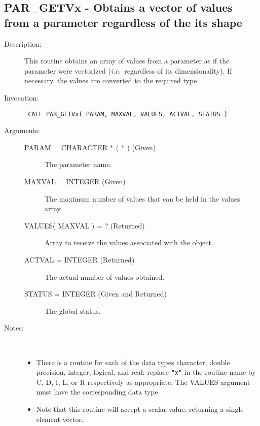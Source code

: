 \documentclass[twoside,11pt]{article}
\newcommand{\xlabel}[1]{}
\newlength{\sstbannerlength}
\newlength{\sstcaptionlength}
\newlength{\sstexampleslength}
\newlength{\sstexampleswidth}
\newcommand{\sstroutine}[3]{
   \goodbreak
   \rule{\textwidth}{0.5mm}
   \vspace{-7ex}
   \newline
   \settowidth{\sstbannerlength}{{\Large {\bf #1}}}
   \setlength{\sstcaptionlength}{\textwidth}
   \setlength{\sstexampleslength}{\textwidth}
   \addtolength{\sstbannerlength}{0.5em}
   \addtolength{\sstcaptionlength}{-2.0\sstbannerlength}
   \addtolength{\sstcaptionlength}{-5.0pt}
   \settowidth{\sstexampleswidth}{{\bf Examples:}}
   \addtolength{\sstexampleslength}{-\sstexampleswidth}
   \parbox[t]{\sstbannerlength}{\flushleft{\Large {\bf #1}}}
   \parbox[t]{\sstcaptionlength}{\center{\Large #2}}
   \parbox[t]{\sstbannerlength}{\flushright{\Large {\bf #1}}}
   \begin{description}
      #3
   \end{description}
}
\newcommand{\sstdescription}[1]{\item[Description:] #1}
\newcommand{\sstinvocation}[1]{\item[Invocation:]\hspace{0.4em}{\tt #1}}
\newcommand{\sstarguments}[1]{
   \item[Arguments:] \mbox{} \\
   \vspace{-3.5ex}
   \begin{description}
      #1
   \end{description}
}
\newcommand{\sstsubsection}[1]{ \item[{#1}] \mbox{} \\}
\newcommand{\sstnotes}[1]{\item[Notes:] \mbox{} \\[1.3ex] #1}
\newcommand{\sstitemlist}[1]{
  \mbox{} \\
  \vspace{-7ex}
  \begin{itemize}
     #1
  \end{itemize}
}
\newcommand{\sstitem}{\item}
\newcommand{\ssttt}{\tt}
\renewcommand{\sstroutine}[3]{
      \subsection{\xlabel{12}#1\xlabel{#1}-\label{#1}#2}
      \begin{description}
         #3
      \end{description}
   }
\renewcommand{\sstdescription}[1]{\item[Description:]
      \begin{description}
         #1
      \end{description}
   }
\renewcommand{\sstinvocation}[1]{\item[Invocation:]
      \begin{description}
         {\ssttt #1}
      \end{description}
   }
\renewcommand{\sstarguments}[1]{
      \item[Arguments:]
      \begin{description}
         #1
      \end{description}
   }
\renewcommand{\sstsubsection}[1]{\item[{#1}]}
\renewcommand{\sstnotes}[1]{\item[Notes:]
      \begin{description}
         #1
      \end{description}
   }
\newcommand{\sstitemlist}[1]{
      \begin{itemize}
         #1
      \end{itemize}
   }
\begin{document}
\sstroutine{
   PAR\_GETVx
}{
   Obtains a vector of values from a parameter regardless of the
   its shape
}{
   \sstdescription{
      This routine obtains an array of values from a parameter
      as if the parameter were vectorized ({\it i.e.}\ regardless of its
      dimensionality).  If necessary, the values are converted to the
      required type.
   }
   \sstinvocation{
      CALL PAR\_GETVx( PARAM, MAXVAL, VALUES, ACTVAL, STATUS )
   }
   \sstarguments{
      \sstsubsection{
         PARAM = CHARACTER $*$ ( $*$ ) (Given)
      }{
         The parameter name.
      }
      \sstsubsection{
         MAXVAL = INTEGER (Given)
      }{
         The maximum number of values that can be held in the values
         array.
      }
      \sstsubsection{
         VALUES( MAXVAL ) = ? (Returned)
      }{
         Array to receive the values associated with the object.
      }
      \sstsubsection{
         ACTVAL = INTEGER (Returned)
      }{
         The actual number of values obtained.
      }
      \sstsubsection{
         STATUS = INTEGER (Given and Returned)
      }{
         The global status.
      }
   }
   \sstnotes{
      \sstitemlist{

         \sstitem
         There is a routine for each of the data types character,
         double precision, integer, logical, and real: replace {\tt "x"} in the
         routine name by C, D, I, L, or R respectively as appropriate.  The
         VALUES argument must have the corresponding data type.

         \sstitem
         Note that this routine will accept a scalar value, returning
         a single-element vector.
      }
   }
}
\end{document}
